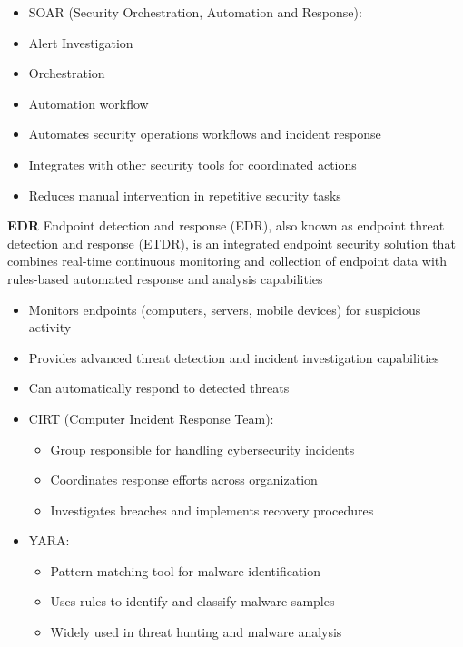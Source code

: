\begin{itemize}
  \item SOAR (Security Orchestration, Automation and Response):
  \item Alert Investigation
  \item Orchestration
  \item Automation workflow
	\item Automates security operations workflows and incident response
	\item Integrates with other security tools for coordinated actions
	\item Reduces manual intervention in repetitive security tasks
\end{itemize}

\textbf{EDR}
Endpoint detection and response (EDR), also known as endpoint threat detection and response (ETDR), is an integrated endpoint security solution that combines real-time continuous monitoring and collection of endpoint data with rules-based automated response and analysis capabilities
\begin{itemize}
	\item Monitors endpoints (computers, servers, mobile devices) for suspicious activity
	\item Provides advanced threat detection and incident investigation capabilities
	\item Can automatically respond to detected threats
\end{itemize}

\begin{itemize}
  \item CIRT (Computer Incident Response Team):
  \begin{itemize}
    \tightlist
		\item Group responsible for handling cybersecurity incidents
		\item Coordinates response efforts across organization
		\item Investigates breaches and implements recovery procedures
  \end{itemize}

  \item YARA:
  \begin{itemize}
    \tightlist
		\item Pattern matching tool for malware identification
		\item Uses rules to identify and classify malware samples
		\item Widely used in threat hunting and malware analysis
  \end{itemize}
\end{itemize}

